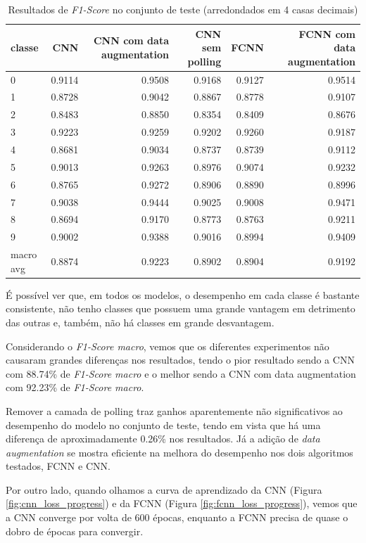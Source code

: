 \documentclass[12pt]{article}
\begin{document}
\begin{table}[H]\scriptsize\centering
\begin{tabular}{l|rrrrr}
\toprule
classe & CNN & CNN com data augmentation & CNN sem polling & FCNN & FCNN com data augmentation \\
\midrule
0 & 0.9114 & 0.9508 & 0.9168 & 0.9127 & 0.9514 \\
1 & 0.8728 & 0.9042 & 0.8867 & 0.8778 & 0.9107 \\
2 & 0.8483 & 0.8850 & 0.8354 & 0.8409 & 0.8676 \\
3 & 0.9223 & 0.9259 & 0.9202 & 0.9260 & 0.9187 \\
4 & 0.8681 & 0.9034 & 0.8737 & 0.8739 & 0.9112 \\
5 & 0.9013 & 0.9263 & 0.8976 & 0.9074 & 0.9232 \\
6 & 0.8765 & 0.9272 & 0.8906 & 0.8890 & 0.8996 \\
7 & 0.9038 & 0.9444 & 0.9025 & 0.9008 & 0.9471 \\
8 & 0.8694 & 0.9170 & 0.8773 & 0.8763 & 0.9211 \\
9 & 0.9002 & 0.9388 & 0.9016 & 0.8994 & 0.9409 \\
\midrule
macro avg & 0.8874 & 0.9223 & 0.8902 & 0.8904 & 0.9192 \\
\bottomrule
\end{tabular}

    
\caption{Resultados de \textit{F1-Score} no conjunto de teste (arredondados em 4 casas decimais)}
\label{table:results_f1}
\end{table}

É possível ver que, em todos os modelos, o desempenho em cada classe é bastante consistente, não tenho classes que possuem uma grande vantagem em detrimento das outras e, também, não há classes em grande desvantagem. 

Considerando o \textit{F1-Score macro}, vemos que os diferentes experimentos não causaram grandes diferenças nos resultados, tendo o pior resultado sendo a CNN com 88.74\% de \textit{F1-Score macro} e o melhor sendo a CNN com data augmentation com 92.23\% de \textit{F1-Score macro}.

Remover a camada de polling traz ganhos aparentemente não significativos ao desempenho do modelo no conjunto de teste, tendo em vista que há uma diferença de aproximadamente 0.26\% nos resultados. Já a adição de \textit{data augmentation} se mostra eficiente na melhora do desempenho nos dois algoritmos testados, FCNN e CNN. 


Por outro lado, quando olhamos a curva de aprendizado da CNN (Figura \ref{fig:cnn_loss_progress}) e da FCNN (Figura \ref{fig:fcnn_loss_progress}), vemos que a CNN converge por volta de 600 épocas, enquanto a FCNN precisa de quase o dobro de épocas para convergir.
\end{document}
